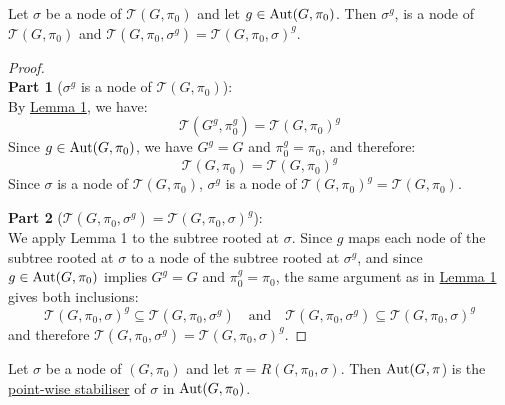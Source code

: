   \begin{corollary}\label{cor: Corollary}
  Let $\sigma$ be a node of $\mathcal{T} (G,\pi_0)$ and let $g \mathrel{\in}\operatorname{Aut} (G, \pi_0)$. Then $\sigma^g$, is a node of $\mathcal{T} (G,\pi_0)$ and $\mathcal{T} (G, \pi_0, \sigma^g) = \mathcal{T} {(G, \pi_0, \sigma)}^g$.
  \end{corollary}

\vspace{-0.7em}
  \begin{proof}
    \leavevmode\\
    \textbf{Part 1} ($\sigma^g$ is a node of $\mathcal{T}(G, \pi_0)$):\\
    By \hyperref[lem: equivariance of the search tree]{Lemma 1}, we have: 
    \[
    \mathcal{T}(G^{g}, \pi_0^{g}) = \mathcal{T}{(G, \pi_0)}^{g}
    \]
    Since $g \in \operatorname{Aut}(G, \pi_0)$, we have $G^g = G$ and $\pi_0^g = \pi_0$, and therefore:
    \[
    \mathcal{T}(G, \pi_0) = \mathcal{T}{(G, \pi_0)}^{g}
    \]
    Since $\sigma$ is a node of $\mathcal{T}(G, \pi_0)$, $\sigma^g$ is a node of
    $\mathcal{T}{(G, \pi_0)}^g = \mathcal{T}(G, \pi_0)$.
    
    \textbf{Part 2} ($\mathcal{T}(G, \pi_0, \sigma^g) = \mathcal{T}{(G, \pi_0, \sigma)}^g$):\\
    We apply Lemma 1 to the subtree rooted at $\sigma$. Since $g$ maps each node
    of the subtree rooted at $\sigma$ to a node of the subtree rooted at $\sigma^g$,
    and since $g \in \operatorname{Aut}(G, \pi_0)$ implies $G^g = G$ and $\pi_0^g = \pi_0$,
    the same argument as in \hyperref[lem: equivariance of the search tree]{Lemma 1} gives both inclusions:
    \[\mathcal{T}{(G, \pi_0, \sigma)}^g \subseteq \mathcal{T}(G, \pi_0, \sigma^g)
    \quad \text{and} \quad
    \mathcal{T}(G, \pi_0, \sigma^g) \subseteq \mathcal{T}{(G, \pi_0, \sigma)}^g\]
    and therefore $\mathcal{T}(G, \pi_0, \sigma^g) = \mathcal{T}{(G, \pi_0, \sigma)}^g$.
    \end{proof}
  
  \begin{lemma}
      Let $\sigma$ be a node of $ (G,\pi_0)$ and let $\pi= R (G, \pi_0, \sigma)$. Then $\operatorname{Aut}(G,\pi$) is the   \hyperref[def:pointwise stabiliser]{point-wise stabiliser} of $\sigma$ in $\operatorname{Aut}(G,\pi_0)$.
  \end{lemma}



